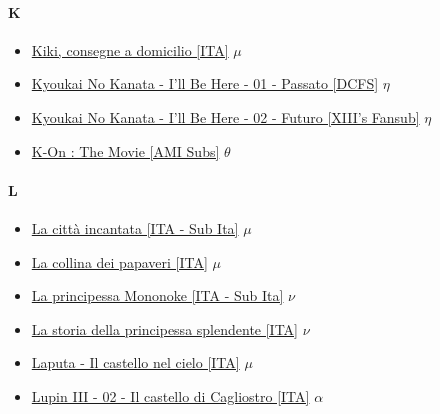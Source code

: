 		\paragraph{K} \hypertarget{FK}{}
			\begin{itemize}
				
				\item \href{https://mega.nz/#!0kgjiQDA!nDBRmaL91TAWuT2pI31f8orADOTFBoNLEP60DEf3W4w} {Kiki, consegne a domicilio [ITA]}  $\mu$   \\
				\item \href{https://mega.nz/#!AEECFDpQ!4Ja8xYnqoi4mfonKt7Nl5EdfZWb2LLMLvYYUJeX0XEw} {Kyoukai No Kanata - I'll Be Here - 01 - Passato [DCFS]}  $\eta$   \\
				\item \href{https://mega.nz/#!kI92nawD!Brhf50MlvD8g9cEdgWGiTGKl_K8MVki9rBP4li0Xcto} {Kyoukai No Kanata - I'll Be Here - 02 - Futuro [XIII's Fansub]}  $\eta$   \\\item \href{https://mega.nz/#!po9FSbCK!yC7wocP01orVdvY5Sx3hOj2PH4tzZHVufV7FLR1D6As} {K-On : The Movie [AMI Subs]}  $\theta$   \\
			
		\end{itemize}	
			
		
			
		\paragraph{L} \hypertarget{FL}{}
			\begin{itemize}
				
				\item \href{https://mega.nz/#!QpAkgZhb!FL0QJ1BuUnj50ZruLtJ--I8i_0-3KymlC59WUl-Dz1E} {La città incantata [ITA - Sub Ita]} $\mu$   \\  
				\item \href{https://mega.nz/#!JxxyVIbb!RGmIMaowexazv51Vz17FNpyp97p0kMsR_8Fr-LeX7MY} {La collina dei papaveri [ITA]} $\mu$   \\ 	
				\item \href{https://mega.nz/#!vxM1HTQb!YbIN2xUntl1j8y91TgJEfH79aPvQ6vrpNgiTYhg0yYQ} {La principessa Mononoke [ITA - Sub Ita]} $\nu$   \\ 
				\item \href{https://mega.nz/#!K08xUJSC!h8gYC1W_qk4C72e9NWTfo7Ir3jnuRiPEdykbg_Qc9c8} {La storia della principessa splendente [ITA]} $\nu$   \\ 		 
				\item \href{https://mega.nz/#!k4wylYrI!X56fK59g0J1dc8l_eafr1DE3HREPRhI6_OBwB4H8XOg} {Laputa - Il castello nel cielo [ITA]} $\mu$   \\ 	
				 \item \href{https://mega.nz/#!QJ0AxJBL!XY2T-QXO6vqdotvT2siM4y7qDEMhAPtTl-6uhc0AVsI} {Lupin III - 02 - Il castello di Cagliostro [ITA]} $\alpha$   \\  
			
			\end{itemize}
			
